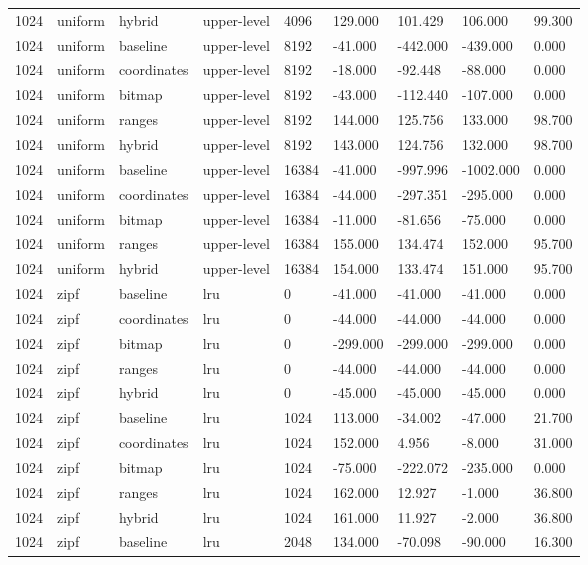 \begin{tabular}{lllllllll}
1024 & uniform & hybrid & upper-level & 4096 & 129.000 & 101.429 & 106.000 & 99.300 \\
1024 & uniform & baseline & upper-level & 8192 & -41.000 & -442.000 & -439.000 & 0.000 \\
1024 & uniform & coordinates & upper-level & 8192 & -18.000 & -92.448 & -88.000 & 0.000 \\
1024 & uniform & bitmap & upper-level & 8192 & -43.000 & -112.440 & -107.000 & 0.000 \\
1024 & uniform & ranges & upper-level & 8192 & 144.000 & 125.756 & 133.000 & 98.700 \\
1024 & uniform & hybrid & upper-level & 8192 & 143.000 & 124.756 & 132.000 & 98.700 \\
1024 & uniform & baseline & upper-level & 16384 & -41.000 & -997.996 & -1002.000 & 0.000 \\
1024 & uniform & coordinates & upper-level & 16384 & -44.000 & -297.351 & -295.000 & 0.000 \\
1024 & uniform & bitmap & upper-level & 16384 & -11.000 & -81.656 & -75.000 & 0.000 \\
1024 & uniform & ranges & upper-level & 16384 & 155.000 & 134.474 & 152.000 & 95.700 \\
1024 & uniform & hybrid & upper-level & 16384 & 154.000 & 133.474 & 151.000 & 95.700 \\
1024 & zipf & baseline & lru & 0 & -41.000 & -41.000 & -41.000 & 0.000 \\
1024 & zipf & coordinates & lru & 0 & -44.000 & -44.000 & -44.000 & 0.000 \\
1024 & zipf & bitmap & lru & 0 & -299.000 & -299.000 & -299.000 & 0.000 \\
1024 & zipf & ranges & lru & 0 & -44.000 & -44.000 & -44.000 & 0.000 \\
1024 & zipf & hybrid & lru & 0 & -45.000 & -45.000 & -45.000 & 0.000 \\
1024 & zipf & baseline & lru & 1024 & 113.000 & -34.002 & -47.000 & 21.700 \\
1024 & zipf & coordinates & lru & 1024 & 152.000 & 4.956 & -8.000 & 31.000 \\
1024 & zipf & bitmap & lru & 1024 & -75.000 & -222.072 & -235.000 & 0.000 \\
1024 & zipf & ranges & lru & 1024 & 162.000 & 12.927 & -1.000 & 36.800 \\
1024 & zipf & hybrid & lru & 1024 & 161.000 & 11.927 & -2.000 & 36.800 \\
1024 & zipf & baseline & lru & 2048 & 134.000 & -70.098 & -90.000 & 16.300 \\

\end{tabular}
